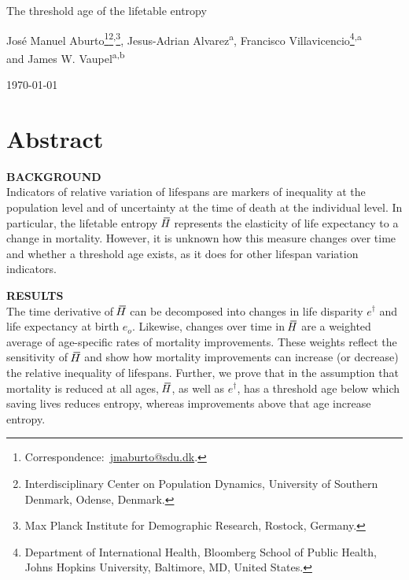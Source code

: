 \documentclass[a4paper,twoside, openright, 12pt, leqno]{article}
\newcommand*\xbar[1]{%
   \hbox{%
     \vbox{%
       \hrule height 0.5pt %
       \kern0.3ex%
       \hbox{%
         \kern-0.28em%
         \ensuremath{#1}%
         \kern-0.05em%
       }%
     }%
   }%
}
\newcommand\fnsep{\textsuperscript{,}}
\begin{document}
\renewcommand{\thefootnote}{\alph{footnote}}

\thispagestyle{empty}

\begin{center}
    
    \vspace*{1cm}
    \LARGE{The threshold age of the lifetable entropy}	
    \vspace{.4cm}    
        
           
    \vspace{1cm}
    \large Jos\'e Manuel Aburto\footnote[*]{Correspondence:~\href{mailto:jmaburto@sdu.dk}{jmaburto@sdu.dk}.}\footnote{Interdisciplinary Center on Population Dynamics, University of Southern Denmark, Odense, Denmark.}\fnsep\footnote{Max Planck Institute for Demographic Research, Rostock, Germany.}, Jesus-Adrian Alvarez\textsuperscript{a}, Francisco Villavicencio\footnote{Department of International Health, Bloomberg School of Public Health, Johns Hopkins University, Baltimore, MD, United States.}\fnsep\textsuperscript{a}\\ and James W. Vaupel\textsuperscript{a}\fnsep\textsuperscript{b}
    
    \vspace{1cm}
    \large\today
    \vspace{1cm}
       
\end{center}

\renewcommand{\thefootnote}{\arabic{footnote}}
\setcounter{footnote}{0}


\section*{Abstract}
\bigskip

\textbf{BACKGROUND} \\
Indicators of relative variation of lifespans are markers of inequality at the population level and of uncertainty at the time of death at the individual level. In particular, the lifetable entropy $\,\xbar{H}$ represents the elasticity of life expectancy to a change in mortality. However, it is unknown how this measure changes over time and whether a threshold age exists, as it does for other lifespan variation indicators.
\bigskip

\noindent\textbf{RESULTS} \\
The time derivative of $\,\xbar{H}$ can be decomposed into changes in life disparity $e^\dagger$ and life expectancy at birth $e_o$. Likewise, changes over time in $\,\xbar{H}$ are a weighted average of age-specific rates of mortality improvements. These weights reflect the sensitivity of $\,\xbar{H}$ and show how mortality improvements can increase (or decrease) the relative inequality of lifespans. Further, we prove that in the assumption that mortality is reduced at all ages, $\,\xbar{H}$, as well as $e^\dagger$, has a threshold age below which saving lives reduces entropy, whereas improvements above that age increase entropy.
\bigskip
\end{document}
